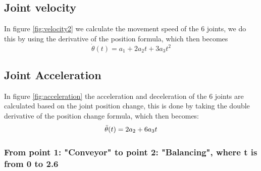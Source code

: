 \subsection{Joint velocity}
In figure \ref{fig:velocity2} we calculate the movement speed of the 6 joints, we do this by using the derivative of the position formula, which then becomes
\begin{equation}
\Dot{\theta}(t)=a_1+2a_2t+3a_3t^2
\end{equation}

\subsection{Joint Acceleration}
In figure \ref{fig:acceleration} the acceleration and deceleration of the 6 joints are calculated based on the joint position change, this is done by taking the double derivative of the position change formula, which then becomes:
\begin{equation}
\Ddot{\theta}(t)=2a_2+6a_3t
\end{equation}

\subsubsection{From point 1: "Conveyor" to point 2: "Balancing", where t is from 0 to 2.6}

